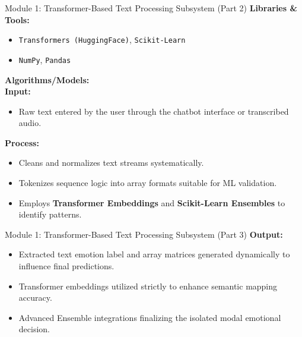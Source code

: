 \documentclass{beamer}
\begin{document}
\begin{frame}{Module 1: Transformer-Based Text Processing Subsystem (Part 2)}
\textbf{Libraries \& Tools:}
\begin{itemize}
    \item \texttt{Transformers (HuggingFace)}, \texttt{Scikit-Learn}
    \item \texttt{NumPy}, \texttt{Pandas}
\end{itemize}

\vspace{0.3cm}
\textbf{Algorithms/Models:}
\\
\textbf{Input:}
\begin{itemize}
    \item Raw text entered by the user through the chatbot interface or transcribed audio.
\end{itemize}

\textbf{Process:}
\begin{itemize}
    \item Cleans and normalizes text streams systematically.
    \item Tokenizes sequence logic into array formats suitable for ML validation.
    \item Employs \textbf{Transformer Embeddings} and \textbf{Scikit-Learn Ensembles} to identify patterns.
\end{itemize}
\end{frame}
\begin{frame}{Module 1: Transformer-Based Text Processing Subsystem (Part 3)}
\textbf{Output:}
\begin{itemize}
    \item Extracted text emotion label and array matrices generated dynamically to influence final predictions.
\end{itemize}
\begin{itemize}
    \item Transformer embeddings utilized strictly to enhance semantic mapping accuracy.
    \item Advanced Ensemble integrations finalizing the isolated modal emotional decision.
\end{itemize}
\end{frame}
\end{document}
